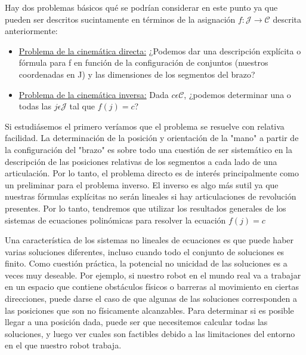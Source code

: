 Hay dos problemas básicos qué se podrían considerar en este punto ya que pueden ser descritos sucintamente en términos de la asignación $ f : \mathcal{J} \longrightarrow \mathcal{C}$ descrita anteriormente:

\begin{itemize}
	\item \underline{Problema de la cinemática directa:} ¿Podemos dar una descripción explícita o fórmula para f en función de la configuración de conjuntos (nuestros coordenadas en J) y las dimensiones de los segmentos del brazo?
	
	\item \underline{Problema de la cinemática inversa:} Dada $c \epsilon \mathcal{C}$, ¿podemos determinar una o todas las $j \epsilon \mathcal{J}$ tal que $f(j) = c$?
\end{itemize}

Si estudiásemos el primero veríamos que el problema se resuelve con relativa facilidad. La determinación de la posición y orientación de la "mano" a partir de la configuración del "brazo" es sobre todo una cuestión de ser sistemático en la descripción de las posiciones relativas de los segmentos a cada lado de una articulación. Por lo tanto, el problema directo es de interés principalmente como un preliminar para el problema inverso. 
El inverso es algo más sutil ya que nuestras fórmulas explícitas no serán lineales si hay articulaciones de revolución presentes. Por lo tanto, tendremos que utilizar los resultados generales de los sistemas de ecuaciones polinómicas para resolver la ecuación $f(j) = c$

Una característica de los sistemas no lineales de ecuaciones es que puede haber varias soluciones diferentes, incluso cuando todo el conjunto de soluciones es finito. Como cuestión práctica, la potencial no unicidad de las soluciones es a veces muy deseable. Por ejemplo, si nuestro robot en el mundo real va a trabajar en un espacio que contiene obstáculos físicos o barreras al movimiento en ciertas direcciones, puede darse el caso de que algunas de las soluciones corresponden a las posiciones que son no físicamente alcanzables.
Para determinar si es posible llegar a una posición dada, puede ser que necesitemos calcular todas las soluciones, y luego ver cuales son factibles debido a las limitaciones del entorno en el que nuestro robot trabaja.